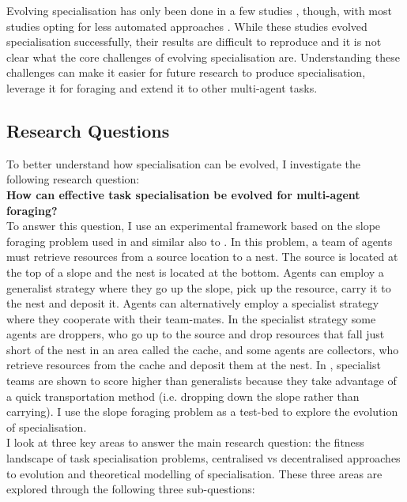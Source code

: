 \documentclass[12pt]{article}
\begin{document}
Evolving specialisation has only been done in a few studies \cite{ferrante:PLOS_CB:2015, nitschke:SEC:2012}, though, with most studies opting for less automated approaches \cite{hamann:Springer:2018}.
While these studies evolved specialisation successfully, their results are difficult to reproduce and it is not clear what the core challenges of evolving specialisation are.
Understanding these challenges can make it easier for future research to produce specialisation, leverage it for foraging and extend it to other multi-agent tasks.

\subsection{Research Questions}

To better understand how specialisation can be evolved, I investigate the following research question:\\

\textbf{How can effective task specialisation be evolved for multi-agent foraging?}\\

To answer this question, I use an experimental framework based on the slope foraging problem used in \cite{ferrante:PLOS_CB:2015} and similar also to \cite{pini:ICSI:2012, pini:Swarm_Intelligence:2011}.
In this problem, a team of agents must retrieve resources from a source location to a nest.
The source is located at the top of a slope and the nest is located at the bottom.
Agents can employ a generalist strategy where they go up the slope, pick up the resource, carry it to the nest and deposit it.
Agents can alternatively employ a specialist strategy where they cooperate with their team-mates.
In the specialist strategy some agents are droppers, who go up to the source and drop resources that fall just short of the nest in an area called the cache, and some agents are collectors, who retrieve resources from the cache and deposit them at the nest.
In \cite{pini:ICSI:2012, pini:Swarm_Intelligence:2011,ferrante:PLOS_CB:2015}, specialist teams are shown to score higher than generalists because they take advantage of a quick transportation method (i.e. dropping down the slope rather than carrying).
I use the slope foraging problem as a test-bed to explore the evolution of specialisation.\\

I look at three key areas to answer the main research question: the fitness landscape of task specialisation problems, centralised vs decentralised approaches to evolution and theoretical modelling of specialisation.
These three areas are explored through the following three sub-questions:\\
\end{document}
